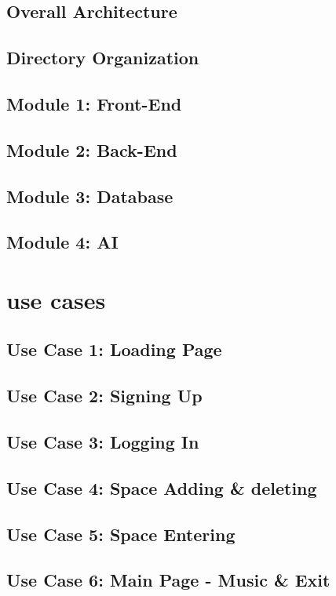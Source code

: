 \documentclass[conference]{IEEEtran}
\begin{document}
    \subsection{Overall Architecture}
    \subsection{Directory Organization}
    \subsection{Module 1: Front-End}
    \subsection{Module 2: Back-End}
    \subsection{Module 3: Database}
    \subsection{Module 4: AI}
    
\section{use cases}
    \subsection{Use Case 1: Loading Page}
    \subsection{Use Case 2: Signing Up}
    \subsection{Use Case 3: Logging In}
    \subsection{Use Case 4: Space Adding \& deleting}
    \subsection{Use Case 5: Space Entering}
    \subsection{Use Case 6: Main Page - Music \& Exit}
\end{document}
